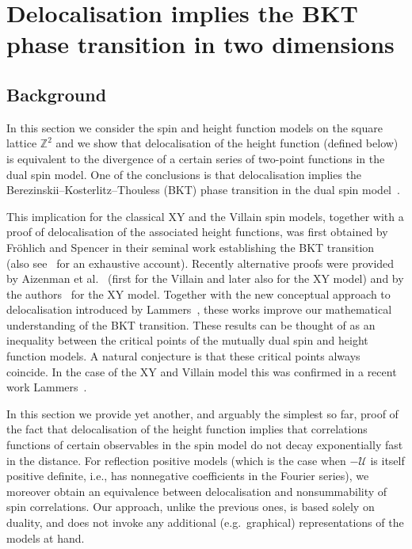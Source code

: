 \documentclass[11pt, reqno]{amsart}
\numberwithin{equation}{section}
\theoremstyle{definition}
\theoremstyle{remark}
\begin{document}


\section{Delocalisation implies the BKT phase transition in two dimensions} \label{sec:bkt}
\subsection{Background}
In this section we consider the spin and height function models on the square lattice $\mathbb Z^2$ and we show that delocalisation of the height function (defined below) is equivalent to the divergence of a certain series of two-point functions in the dual spin model. One of the conclusions is that delocalisation implies the Berezinskii--Kosterlitz--Thouless (BKT) phase transition in the dual spin model~\cite{Ber1,KosTho}. 

This implication for the classical XY and the Villain spin models, together with a proof of delocalisation of the associated height functions, was first obtained by Fr\"{o}hlich and Spencer in their seminal work establishing the BKT transition~\cite{FroSpe} (also see~\cite{KP} for an exhaustive account).
Recently alternative proofs were provided by Aizenman et al.~\cite{AHPS} (first for the Villain and later also for the XY model) and by the authors~\cite{vEnLis} for the XY model. Together with the new conceptual approach to delocalisation introduced by Lammers~\cite{Lammers}, these works improve our mathematical understanding of the BKT transition.
These results can be thought of as an inequality between the critical points of the mutually dual spin and height function models.
A natural conjecture is that these critical points always coincide. In the case of the XY and Villain model this was confirmed in a recent work Lammers~\cite{Lam23}.


In this section we provide yet another, and arguably the simplest so far, proof of the fact that delocalisation of the height function implies that correlations functions of certain observables in the spin model do not decay exponentially fast in the distance. 
For reflection positive models (which is the case when $-\mathcal U$ is itself positive definite, i.e., has nonnegative coefficients in the Fourier series), we moreover obtain an equivalence between delocalisation and nonsummability of spin correlations.
Our approach, unlike the previous ones, is based solely on duality, and does not invoke any additional (e.g.~graphical) representations of the models at hand. 
\end{document}
